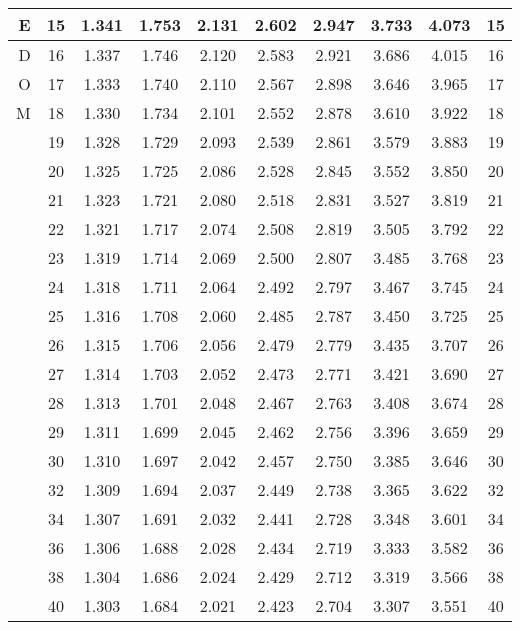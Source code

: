 \begin{table}[H]
\begin{center}
{\begin{tabular}{|r|c|c|c|c|c|c|c|c|c|}
\hline E  &15 &   1.341 &  1.753 &  2.131 &  2.602 &  2.947 &  3.733 &  4.073 &  15 \\ 
\hline D  &16 &   1.337 &  1.746 &  2.120 &  2.583 &  2.921 &  3.686 &  4.015 &  16 \\ 
\hline O  &17 &   1.333 &  1.740 &  2.110 &  2.567 &  2.898 &  3.646 &  3.965 &  17  \\ 
\hline M  &18 &   1.330 &  1.734 &  2.101 &  2.552 &  2.878 &  3.610 &  3.922 &  18  \\ 
\hline    &19 &   1.328 &  1.729 &  2.093 &  2.539 &  2.861 &  3.579 &  3.883 &  19  \\ 
\hline    &20 &   1.325 &  1.725 &  2.086 &  2.528 &  2.845 &  3.552 &  3.850 &  20  \\ 
\hline    &21 &   1.323 &  1.721 &  2.080 &  2.518 &  2.831 &  3.527 &  3.819 &  21  \\ 
\hline    &22 &   1.321 &  1.717 &  2.074 &  2.508 &  2.819 &  3.505 &  3.792 &  22  \\
\hline    &23 &   1.319 &  1.714 &  2.069 &  2.500 &  2.807 &  3.485 &  3.768 &  23  \\
\hline    &24 &   1.318 &  1.711 &  2.064 &  2.492 &  2.797 &  3.467 &  3.745 &  24  \\
\hline    &25 &   1.316 &  1.708 &  2.060 &  2.485 &  2.787 &  3.450 &  3.725 &  25  \\
\hline    &26 &   1.315 &  1.706 &  2.056 &  2.479 &  2.779 &  3.435 &  3.707 &  26  \\
\hline    &27 &   1.314 &  1.703 &  2.052 &  2.473 &  2.771 &  3.421 &  3.690 &  27  \\
\hline    &28 &   1.313 &  1.701 &  2.048 &  2.467 &  2.763 &  3.408 &  3.674 &  28  \\
\hline    &29 &   1.311 &  1.699 &  2.045 &  2.462 &  2.756 &  3.396 &  3.659 &  29  \\
\hline    &30 &   1.310 &  1.697 &  2.042 &  2.457 &  2.750 &  3.385 &  3.646 &  30  \\
\hline    &32 &   1.309 &  1.694 &  2.037 &  2.449 &  2.738 &  3.365 &  3.622 &  32  \\
\hline    &34 &   1.307 &  1.691 &  2.032 &  2.441 &  2.728 &  3.348 &  3.601 &  34 \\
\hline    &36 &   1.306 &  1.688 &  2.028 &  2.434 &  2.719 &  3.333 &  3.582 &  36  \\
\hline    &38 &   1.304 &  1.686 &  2.024 &  2.429 &  2.712 &  3.319 &  3.566 &  38 \\
\hline    &40 &   1.303 &  1.684 &  2.021 &  2.423 &  2.704 &  3.307 &  3.551 &  40  \\

\end{tabular}}
\end{center}
\end{table}
